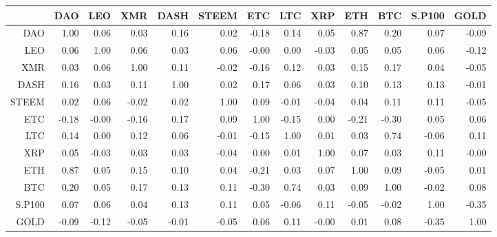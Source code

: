 \begin{table}[ht]
\centering
\begin{tabular}{rrrrrrrrrrrrr}
  \hline
 & DAO & LEO & XMR & DASH & STEEM & ETC & LTC & XRP & ETH & BTC & S.P100 & GOLD \\ 
  \hline
DAO & 1.00 & 0.06 & 0.03 & 0.16 & 0.02 & -0.18 & 0.14 & 0.05 & 0.87 & 0.20 & 0.07 & -0.09 \\ 
  LEO & 0.06 & 1.00 & 0.06 & 0.03 & 0.06 & -0.00 & 0.00 & -0.03 & 0.05 & 0.05 & 0.06 & -0.12 \\ 
  XMR & 0.03 & 0.06 & 1.00 & 0.11 & -0.02 & -0.16 & 0.12 & 0.03 & 0.15 & 0.17 & 0.04 & -0.05 \\ 
  DASH & 0.16 & 0.03 & 0.11 & 1.00 & 0.02 & 0.17 & 0.06 & 0.03 & 0.10 & 0.13 & 0.13 & -0.01 \\ 
  STEEM & 0.02 & 0.06 & -0.02 & 0.02 & 1.00 & 0.09 & -0.01 & -0.04 & 0.04 & 0.11 & 0.11 & -0.05 \\ 
  ETC & -0.18 & -0.00 & -0.16 & 0.17 & 0.09 & 1.00 & -0.15 & 0.00 & -0.21 & -0.30 & 0.05 & 0.06 \\ 
  LTC & 0.14 & 0.00 & 0.12 & 0.06 & -0.01 & -0.15 & 1.00 & 0.01 & 0.03 & 0.74 & -0.06 & 0.11 \\ 
  XRP & 0.05 & -0.03 & 0.03 & 0.03 & -0.04 & 0.00 & 0.01 & 1.00 & 0.07 & 0.03 & 0.11 & -0.00 \\ 
  ETH & 0.87 & 0.05 & 0.15 & 0.10 & 0.04 & -0.21 & 0.03 & 0.07 & 1.00 & 0.09 & -0.05 & 0.01 \\ 
  BTC & 0.20 & 0.05 & 0.17 & 0.13 & 0.11 & -0.30 & 0.74 & 0.03 & 0.09 & 1.00 & -0.02 & 0.08 \\ 
  S.P100 & 0.07 & 0.06 & 0.04 & 0.13 & 0.11 & 0.05 & -0.06 & 0.11 & -0.05 & -0.02 & 1.00 & -0.35 \\ 
  GOLD & -0.09 & -0.12 & -0.05 & -0.01 & -0.05 & 0.06 & 0.11 & -0.00 & 0.01 & 0.08 & -0.35 & 1.00 \\ 
   \hline
\end{tabular}
\end{table}
